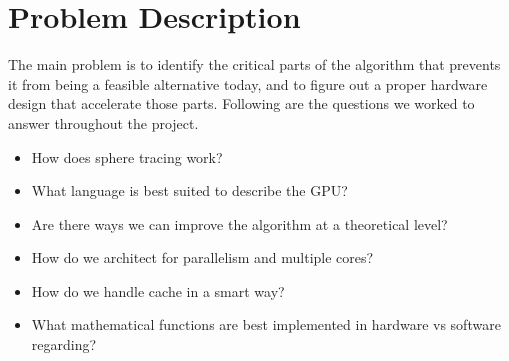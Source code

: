 \chapter{Problem Description}

The main problem is to identify the critical parts of the algorithm that
prevents it from being a feasible alternative today, and to figure out a proper
hardware design that accelerate those parts. Following are the questions we
worked to answer throughout the project.

\begin{itemize}
	\item	How does sphere tracing work?
	\item What language is best suited to describe the GPU?
	\item Are there ways we can improve the algorithm at a theoretical level?
	\item How do we architect for parallelism and multiple cores?
	\item How do we handle cache in a smart way?
	\item What mathematical functions are best implemented in hardware vs software regarding?

\end{itemize}
